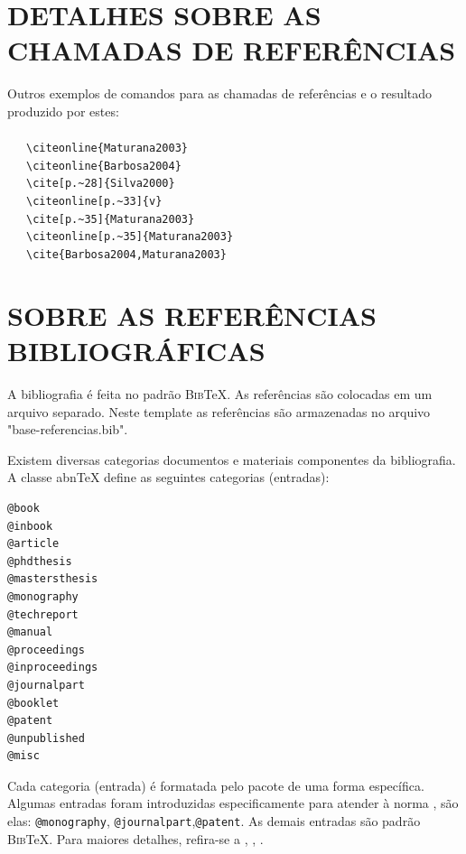 \chapter{DETALHES SOBRE AS CHAMADAS DE REFERÊNCIAS}
\label{chap:referUtilizadas}

Outros exemplos de comandos para as chamadas de referências e o resultado produzido por estes:\\
\\ \ \ \  \verb|\citeonline{Maturana2003}|\\
 \ \ \   \verb|\citeonline{Barbosa2004}|\\
\cite[p.~28]{Silva2000} \ \ \  \verb|\cite[p.~28]{Silva2000}|\\
 \ \ \   \verb|\citeonline[p.~33]{v}|\\
\cite[p.~35]{Maturana2003} \ \ \   \verb|\cite[p.~35]{Maturana2003}|\\
 \ \ \   \verb|\citeonline[p.~35]{Maturana2003}|\\
\cite{Barbosa2004,Maturana2003} \ \ \   \verb|\cite{Barbosa2004,Maturana2003}|\\

\chapter{SOBRE AS REFERÊNCIAS BIBLIOGRÁFICAS}
\label{chap:apSobreRefer}

A bibliografia é feita no padrão \textsc{Bib}\TeX{}. As referências são colocadas em um arquivo separado. Neste template as referências são armazenadas no arquivo "base-referencias.bib".

Existem diversas categorias documentos e materiais componentes da bibliografia. A classe abn\TeX{} define as seguintes categorias (entradas):

\begin{verbatim}
@book
@inbook
@article
@phdthesis
@mastersthesis
@monography
@techreport
@manual
@proceedings
@inproceedings
@journalpart
@booklet
@patent
@unpublished
@misc
\end{verbatim}

Cada categoria (entrada) é formatada pelo pacote  de uma forma específica. Algumas entradas foram introduzidas especificamente para atender à norma , são elas: \verb|@monography|, \verb|@journalpart|,\verb|@patent|. As demais entradas são padrão \textsc{Bib}\TeX{}. Para maiores detalhes, refira-se a , , .

